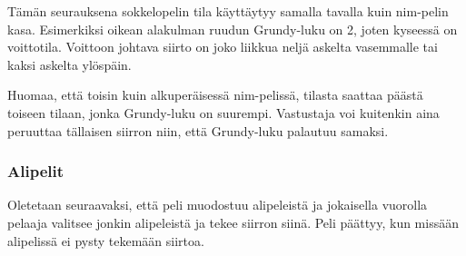 \begin{center}
\end{center}

Tämän seurauksena sokkelopelin
tila käyttäytyy
samalla tavalla kuin nim-pelin kasa.
Esimerkiksi oikean alakulman ruudun
Grundy-luku on 2,
joten kyseessä on voittotila.
Voittoon johtava siirto on joko liikkua neljä
askelta vasemmalle tai kaksi askelta ylöspäin.

Huomaa, että toisin kuin alkuperäisessä nim-pelissä,
tilasta saattaa päästä toiseen tilaan,
jonka Grundy-luku on suurempi.
Vastustaja voi kuitenkin aina peruuttaa
tällaisen siirron niin,
että Grundy-luku palautuu samaksi.

\subsubsection{Alipelit}

Oletetaan seuraavaksi, että peli muodostuu
alipeleistä ja jokaisella vuorolla
pelaaja valitsee jonkin alipeleistä ja
tekee siirron siinä.
Peli päättyy, kun missään alipelissä ei
pysty tekemään siirtoa.


